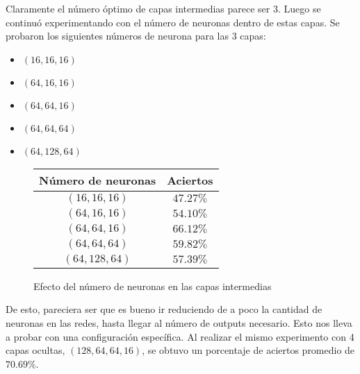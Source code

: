 \documentclass[letterpaper,11pt]{article} %
\begin{document}
  Claramente el número óptimo de capas intermedias parece ser 3. Luego se continuó experimentando con el número de neuronas dentro de estas capas. Se probaron los siguientes números de neurona para las 3 capas:

  \begin{itemize}
    \item $(16, 16, 16)$
    \item $(64, 16, 16)$
    \item $(64, 64, 16)$
    \item $(64, 64, 64)$
    \item $(64, 128, 64)$
  \end{itemize}

  \begin{figure}
    \centering
    \begin{tabular}{|c|c|}
      \hline
      Número de neuronas & Aciertos \\
      \hline
      $(16, 16, 16)$ & $47.27\%$ \\
      \hline
      $(64, 16, 16)$ & $54.10\%$ \\
      \hline
      $(64, 64, 16)$ & $66.12\%$ \\
      \hline
      $(64, 64, 64)$ & $59.82\%$ \\
      \hline
      $(64, 128, 64)$ & $57.39\%$ \\
      \hline
    \end{tabular}
    \caption{Efecto del número de neuronas en las capas intermedias}
  \end{figure}

  De esto, pareciera ser que es bueno ir reduciendo de a poco la cantidad de neuronas en las redes, hasta llegar al número de outputs necesario. Esto nos lleva a probar con una configuración específica. Al realizar el mismo experimento con 4 capas ocultas, $(128, 64, 64, 16)$, se obtuvo un porcentaje de aciertos promedio de $70.69\%$.

\end{document}
